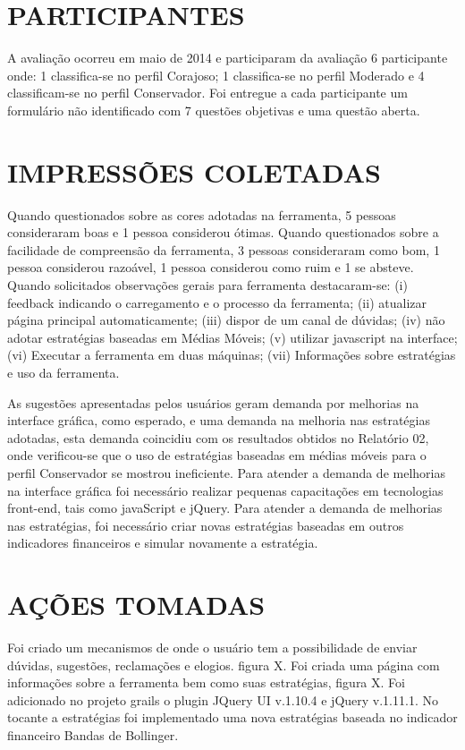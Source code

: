 \begin{apendicesenv}
\section{PARTICIPANTES}
A avaliação ocorreu em maio de 2014 e participaram da avaliação 6 participante onde: 1 classifica-se no perfil Corajoso; 1 classifica-se no perfil Moderado e 4 classificam-se no perfil Conservador. Foi entregue a cada participante um formulário não identificado com 7 questões objetivas e uma questão aberta. 

\section{IMPRESSÕES COLETADAS}
Quando questionados sobre as cores adotadas na ferramenta, 5 pessoas consideraram boas e 1 pessoa considerou ótimas. Quando questionados sobre a facilidade de compreensão da ferramenta, 3 pessoas consideraram como bom, 1 pessoa considerou razoável, 1 pessoa considerou como ruim e 1 se absteve. Quando solicitados observações gerais para ferramenta destacaram-se: (i) feedback indicando o carregamento e o processo da ferramenta; (ii) atualizar página principal automaticamente; (iii) dispor de um canal de dúvidas; (iv) não adotar estratégias baseadas em Médias Móveis; (v) utilizar javascript na interface; (vi) Executar a ferramenta em duas máquinas; (vii) Informações sobre estratégias e uso da ferramenta.

As sugestões apresentadas pelos usuários geram demanda por melhorias na interface gráfica, como esperado, e uma demanda na melhoria nas estratégias adotadas, esta demanda coincidiu com os resultados obtidos no Relatório 02, onde verificou-se que o uso de estratégias baseadas em médias móveis para o perfil Conservador se mostrou ineficiente. Para atender a demanda de melhorias na interface gráfica foi necessário realizar pequenas capacitações em tecnologias front-end, tais como javaScript e jQuery. Para atender a demanda de melhorias nas estratégias, foi necessário criar novas estratégias baseadas em outros indicadores financeiros e simular novamente a estratégia.

\section{AÇÕES TOMADAS} 
Foi criado um mecanismos de onde o usuário tem a possibilidade de enviar dúvidas, sugestões, reclamações e elogios. figura X. Foi criada uma página com informações sobre a ferramenta bem como suas estratégias, figura X. Foi adicionado no projeto grails o plugin JQuery UI v.1.10.4 e jQuery v.1.11.1. No tocante a estratégias foi implementado uma nova estratégias baseada no indicador financeiro Bandas de Bollinger.



\end{apendicesenv}
